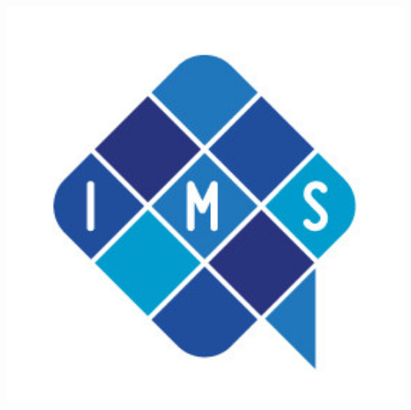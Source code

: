 \documentclass[a0,landscape]{a0poster}
\begin{document}
%
\begin{minipage}[b]{0.20\linewidth}
	\centering\includegraphics[width=15cm]{Bilder/logo_IMS_klein.jpg} %
\end{minipage}

\vspace{1cm} %

\end{document}

